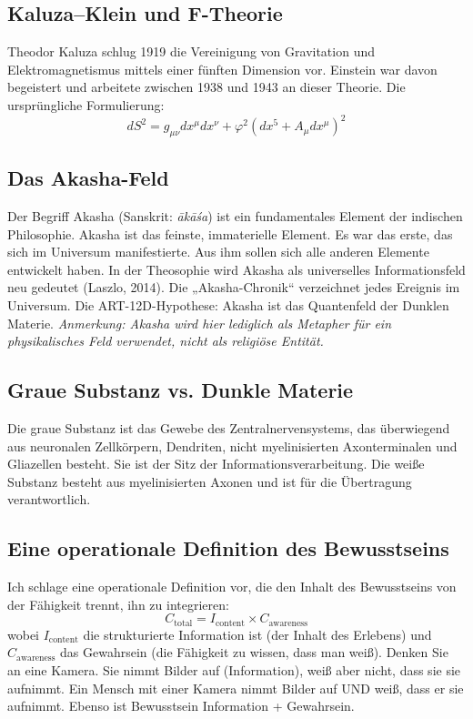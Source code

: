 \subsection{Kaluza--Klein und F-Theorie}
Theodor Kaluza schlug 1919 die Vereinigung von Gravitation und Elektromagnetismus mittels einer fünften Dimension vor. Einstein war davon begeistert und arbeitete zwischen 1938 und 1943 an dieser Theorie. Die ursprüngliche Formulierung:
\begin{equation}
dS^2 = g_{\mu\nu} dx^\mu dx^\nu + \varphi^2(dx^5 + A_{\mu} dx^\mu)^2
\end{equation}

\subsection{Das Akasha-Feld}
Der Begriff Akasha (Sanskrit: \emph{ākāśa}) ist ein fundamentales Element der indischen Philosophie. Akasha ist das feinste, immaterielle Element. Es war das erste, das sich im Universum manifestierte. Aus ihm sollen sich alle anderen Elemente entwickelt haben. In der Theosophie wird Akasha als universelles Informationsfeld neu gedeutet (Laszlo, 2014). Die „Akasha-Chronik`` verzeichnet jedes Ereignis im Universum. Die ART-12D-Hypothese: Akasha ist das Quantenfeld der Dunklen Materie. \textit{Anmerkung: Akasha wird hier lediglich als Metapher für ein physikalisches Feld verwendet, nicht als religiöse Entität.}

\subsection{Graue Substanz vs. Dunkle Materie}
Die graue Substanz ist das Gewebe des Zentralnervensystems, das überwiegend aus neuronalen Zellkörpern, Dendriten, nicht myelinisierten Axonterminalen und Gliazellen besteht. Sie ist der Sitz der Informationsverarbeitung. Die weiße Substanz besteht aus myelinisierten Axonen und ist für die Übertragung verantwortlich.

\subsection{Eine operationale Definition des Bewusstseins}
Ich schlage eine operationale Definition vor, die den Inhalt des Bewusstseins von der Fähigkeit trennt, ihn zu integrieren:
\begin{equation}
C_{\text{total}} = I_{\text{content}} \times C_{\text{awareness}}
\end{equation}
wobei $I_{\text{content}}$ die strukturierte Information ist (der Inhalt des Erlebens) und $C_{\text{awareness}}$ das Gewahrsein (die Fähigkeit zu wissen, dass man weiß). Denken Sie an eine Kamera. Sie nimmt Bilder auf (Information), weiß aber nicht, dass sie sie aufnimmt. Ein Mensch mit einer Kamera nimmt Bilder auf UND weiß, dass er sie aufnimmt. Ebenso ist Bewusstsein Information + Gewahrsein.

